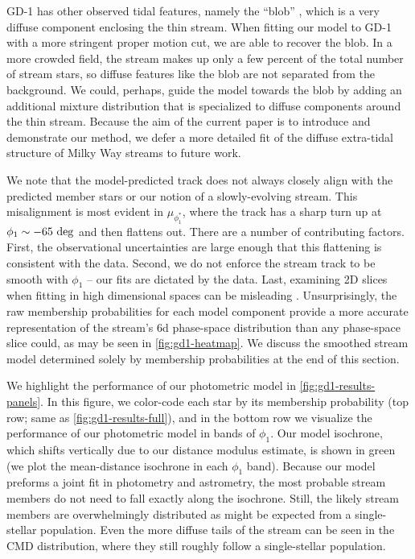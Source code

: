 \documentclass[twocolumn]{aastex631}
\newcommand{\stream}[1]{#1}
\begin{document}
        \stream{GD-1} has other observed tidal features, namely the ``blob''
        \citep{Price-WhelanBonaca2018}, which is a very diffuse component
        enclosing the thin stream. When fitting our model to \stream{GD-1} with
        a more stringent proper motion cut, we are able to recover the blob. In
        a more crowded field, the stream makes up only a few percent of the
        total number of stream stars, so diffuse features like the blob are not
        separated from the background. We could, perhaps, guide the model
        towards the blob by adding an additional mixture distribution that is
        specialized to diffuse components around the thin stream. Because the
        aim of the current paper is to introduce and demonstrate our method, we
        defer a more detailed fit of the diffuse extra-tidal structure of Milky
        Way streams to future work.

        We note that the model-predicted track does not always closely align
        with the predicted member stars or our notion of a slowly-evolving
        stream. This misalignment is most evident in $\mu_{\phi_1^*}$, where the
        track has a sharp turn up at $\phi_1 \sim -65 \ \rm{deg}$ and then
        flattens out. There are a number of contributing factors. First, the
        observational uncertainties are large enough that this flattening is
        consistent with the data. Second, we do not enforce the stream track to
        be smooth with $\phi_1$ -- our fits are dictated by the data.  Last,
        examining 2D slices when fitting in high dimensional spaces can be
        misleading \citep{Aggarwal+2002}. Unsurprisingly, the raw membership
        probabilities for each model component provide a more accurate
        representation of the stream's 6d phase-space distribution than any
        phase-space slice could, as may be seen in \autoref{fig:gd1-heatmap}. We
        discuss the smoothed stream model determined solely by membership
        probabilities at the end of this section.
        
        We highlight the performance of our photometric model in
        \autoref{fig:gd1-results-panels}. In this figure, we color-code each
        star by its membership probability (top row; same as
        \autoref{fig:gd1-results-full}), and in the bottom row we visualize the
        performance of our photometric model in bands of $\phi_1$. Our model
        isochrone, which shifts vertically due to our distance modulus estimate,
        is shown in green (we plot the mean-distance isochrone in each $\phi_1$
        band). Because our model preforms a joint fit in photometry and
        astrometry, the most probable stream members do not need to fall exactly
        along the isochrone.  Still, the likely stream members are
        overwhelmingly distributed as might be expected from a single-stellar
        population.  Even the more diffuse tails of the stream can be seen in
        the CMD distribution, where they still roughly follow a single-stellar
        population. 
        
\end{document}
